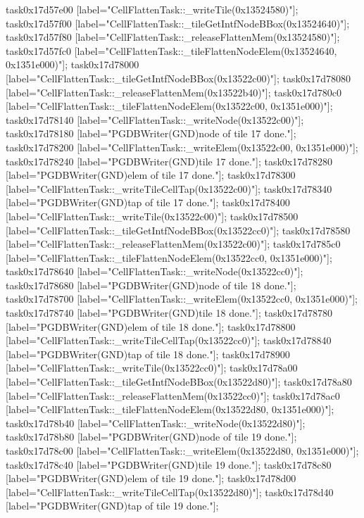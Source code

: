 {	task0x17d57e00 [label="CellFlattenTask::_writeTile(0x13524580)"];
	task0x17d57f00 [label="CellFlattenTask::_tileGetIntfNodeBBox(0x13524640)"];
	task0x17d57f80 [label="CellFlattenTask::_releaseFlattenMem(0x13524580)"];
	task0x17d57fc0 [label="CellFlattenTask::_tileFlattenNodeElem(0x13524640, 0x1351e000)"];
	task0x17d78000 [label="CellFlattenTask::_tileGetIntfNodeBBox(0x13522c00)"];
	task0x17d78080 [label="CellFlattenTask::_releaseFlattenMem(0x13522b40)"];
	task0x17d780c0 [label="CellFlattenTask::_tileFlattenNodeElem(0x13522c00, 0x1351e000)"];
	task0x17d78140 [label="CellFlattenTask::_writeNode(0x13522c00)"];
	task0x17d78180 [label="PGDBWriter(GND)\nCell node of tile 17 done."];
	task0x17d78200 [label="CellFlattenTask::_writeElem(0x13522c00, 0x1351e000)"];
	task0x17d78240 [label="PGDBWriter(GND)\nCell tile 17 done."];
	task0x17d78280 [label="PGDBWriter(GND)\nCell elem of tile 17 done."];
	task0x17d78300 [label="CellFlattenTask::_writeTileCellTap(0x13522c00)"];
	task0x17d78340 [label="PGDBWriter(GND)\nCell tap of tile 17 done."];
	task0x17d78400 [label="CellFlattenTask::_writeTile(0x13522c00)"];
	task0x17d78500 [label="CellFlattenTask::_tileGetIntfNodeBBox(0x13522cc0)"];
	task0x17d78580 [label="CellFlattenTask::_releaseFlattenMem(0x13522c00)"];
	task0x17d785c0 [label="CellFlattenTask::_tileFlattenNodeElem(0x13522cc0, 0x1351e000)"];
	task0x17d78640 [label="CellFlattenTask::_writeNode(0x13522cc0)"];
	task0x17d78680 [label="PGDBWriter(GND)\nCell node of tile 18 done."];
	task0x17d78700 [label="CellFlattenTask::_writeElem(0x13522cc0, 0x1351e000)"];
	task0x17d78740 [label="PGDBWriter(GND)\nCell tile 18 done."];
	task0x17d78780 [label="PGDBWriter(GND)\nCell elem of tile 18 done."];
	task0x17d78800 [label="CellFlattenTask::_writeTileCellTap(0x13522cc0)"];
	task0x17d78840 [label="PGDBWriter(GND)\nCell tap of tile 18 done."];
	task0x17d78900 [label="CellFlattenTask::_writeTile(0x13522cc0)"];
	task0x17d78a00 [label="CellFlattenTask::_tileGetIntfNodeBBox(0x13522d80)"];
	task0x17d78a80 [label="CellFlattenTask::_releaseFlattenMem(0x13522cc0)"];
	task0x17d78ac0 [label="CellFlattenTask::_tileFlattenNodeElem(0x13522d80, 0x1351e000)"];
	task0x17d78b40 [label="CellFlattenTask::_writeNode(0x13522d80)"];
	task0x17d78b80 [label="PGDBWriter(GND)\nCell node of tile 19 done."];
	task0x17d78c00 [label="CellFlattenTask::_writeElem(0x13522d80, 0x1351e000)"];
	task0x17d78c40 [label="PGDBWriter(GND)\nCell tile 19 done."];
	task0x17d78c80 [label="PGDBWriter(GND)\nCell elem of tile 19 done."];
	task0x17d78d00 [label="CellFlattenTask::_writeTileCellTap(0x13522d80)"];
	task0x17d78d40 [label="PGDBWriter(GND)\nCell tap of tile 19 done."];
}
